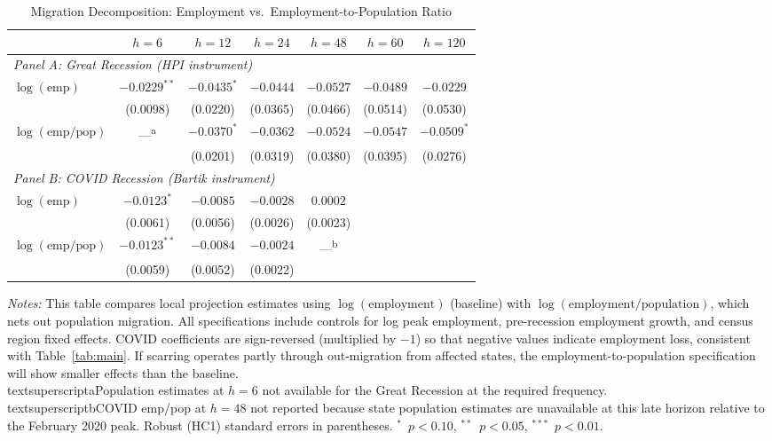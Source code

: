 \begin{table}[H]
\centering
\caption{Migration Decomposition: Employment vs.\ Employment-to-Population Ratio}
\begin{threeparttable}
\small
\begin{tabular}{lcccccc}
\toprule
& $h=6$ & $h=12$ & $h=24$ & $h=48$ & $h=60$ & $h=120$ \\
\midrule
\multicolumn{7}{l}{\textit{Panel A: Great Recession (HPI instrument)}} \\[3pt]
$\log(\text{emp})$ & $-0.0229^{**}$ & $-0.0435^{*}$ & $-0.0444$ & $-0.0527$ & $-0.0489$ & $-0.0229$ \\
& (0.0098) & (0.0220) & (0.0365) & (0.0466) & (0.0514) & (0.0530) \\[3pt]
$\log(\text{emp/pop})$ & ---\textsuperscript{a} & $-0.0370^{*}$ & $-0.0362$ & $-0.0524$ & $-0.0547$ & $-0.0509^{*}$ \\
& & (0.0201) & (0.0319) & (0.0380) & (0.0395) & (0.0276) \\
\midrule
\multicolumn{7}{l}{\textit{Panel B: COVID Recession (Bartik instrument)}} \\[3pt]
$\log(\text{emp})$ & $-0.0123^{*}$ & $-0.0085$ & $-0.0028$ & $0.0002$ & & \\
& (0.0061) & (0.0056) & (0.0026) & (0.0023) & & \\[3pt]
$\log(\text{emp/pop})$ & $-0.0123^{**}$ & $-0.0084$ & $-0.0024$ & ---\textsuperscript{b} & & \\
& (0.0059) & (0.0052) & (0.0022) & & & \\
\bottomrule
\end{tabular}
\begin{tablenotes}[flushleft]
\small
\item \textit{Notes:} This table compares local projection estimates using $\log(\text{employment})$ (baseline) with $\log(\text{employment/population})$, which nets out population migration. All specifications include controls for log peak employment, pre-recession employment growth, and census region fixed effects. COVID coefficients are sign-reversed (multiplied by $-1$) so that negative values indicate employment loss, consistent with Table~\ref{tab:main}. If scarring operates partly through out-migration from affected states, the employment-to-population specification will show smaller effects than the baseline. \\textsuperscript{a}Population estimates at $h=6$ not available for the Great Recession at the required frequency. \\textsuperscript{b}COVID emp/pop at $h=48$ not reported because state population estimates are unavailable at this late horizon relative to the February 2020 peak. Robust (HC1) standard errors in parentheses. $^{*}$~$p<0.10$, $^{**}$~$p<0.05$, $^{***}$~$p<0.01$.
\end{tablenotes}
\end{threeparttable}
\label{tab:migration}
\end{table}
